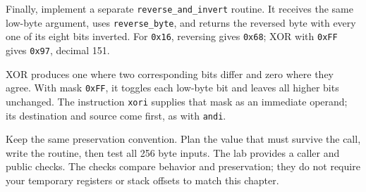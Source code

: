 Finally, implement a separate \texttt{reverse\_and\_invert} routine. It receives
the same low-byte argument, uses \texttt{reverse\_byte}, and returns the reversed
byte with every one of its eight bits inverted. For \texttt{0x16}, reversing
gives \texttt{0x68}; XOR with \texttt{0xFF} gives \texttt{0x97}, decimal 151.

XOR produces one where two corresponding bits differ and zero where they agree.
With mask \texttt{0xFF}, it toggles each low-byte bit and leaves all higher bits
unchanged. The instruction \texttt{xori} supplies that mask as an immediate
operand; its destination and source come first, as with \texttt{andi}.

Keep the same preservation convention. Plan the value that must survive the call,
write the routine, then test all 256 byte inputs. The lab provides a caller and
public checks. The checks compare behavior and preservation; they do not require
your temporary registers or stack offsets to match this chapter.
